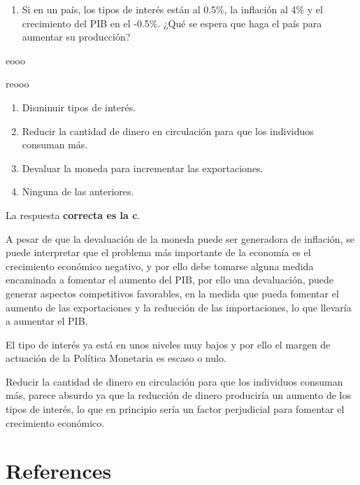\documentclass[
  letterpaper,
  DIV=11,
  numbers=noendperiod]{scrreprt}
\providecommand{\tightlist}{%
  \setlength{\itemsep}{0pt}\setlength{\parskip}{0pt}}\usepackage{longtable,booktabs,array}
\newlength{\cslhangindent}
\newlength{\cslentryspacingunit} %
\newenvironment{CSLReferences}[2] %
 {%
  \setlength{\parindent}{0pt}
  \ifodd #1
  \let\oldpar\par
  \def\par{\hangindent=\cslhangindent\oldpar}
  \fi
  \setlength{\parskip}{#2\cslentryspacingunit}
 }%
 {}
\begin{document}
\begin{enumerate}
\def\labelenumi{\arabic{enumi}.}
\tightlist
\item
  Si en un país, los tipos de interés están al 0.5\%, la inflación al
  4\% y el crecimiento del PIB en el -0.5\%. ¿Qué se espera que haga el
  país para aumentar su producción?
\end{enumerate}

eooo

reooo

\begin{enumerate}
\def\labelenumi{\alph{enumi})}
\item
  Disminuir tipos de interés.
\item
  Reducir la cantidad de dinero en circulación para que los individuos
  consuman más.
\item
  Devaluar la moneda para incrementar las exportaciones.
\item
  Ninguna de las anteriores.
\end{enumerate}

\begin{tcolorbox}[enhanced jigsaw, breakable, leftrule=.75mm, colback=white, left=2mm, colframe=quarto-callout-tip-color-frame, arc=.35mm, bottomrule=.15mm, rightrule=.15mm, toprule=.15mm, opacityback=0]
\begin{minipage}[t]{5.5mm}
\textcolor{quarto-callout-tip-color}{\faLightbulb}
\end{minipage}%
\begin{minipage}[t]{\textwidth - 5.5mm}

La respuesta \textbf{correcta es la c}.

A pesar de que la devaluación de la moneda puede ser generadora de
inflación, se puede interpretar que el problema más importante de la
economía es el crecimiento económico negativo, y por ello debe tomarse
alguna medida encaminada a fomentar el aumento del PIB, por ello una
devaluación, puede generar aspectos competitivos favorables, en la
medida que pueda fomentar el aumento de las exportaciones y la reducción
de las importaciones, lo que llevaría a aumentar el PIB.

El tipo de interés ya está en unos niveles muy bajos y por ello el
margen de actuación de la Política Monetaria es escaso o nulo.

Reducir la cantidad de dinero en circulación para que los individuos
consuman más, parece absurdo ya que la reducción de dinero produciría un
aumento de los tipos de interés, lo que en principio sería un factor
perjudicial para fomentar el crecimiento económico.

\end{minipage}%
\end{tcolorbox}


\hypertarget{references}{%
\chapter*{References}\label{references}}


\hypertarget{refs}{}
\begin{CSLReferences}{0}{0}
\end{CSLReferences}
\end{document}
